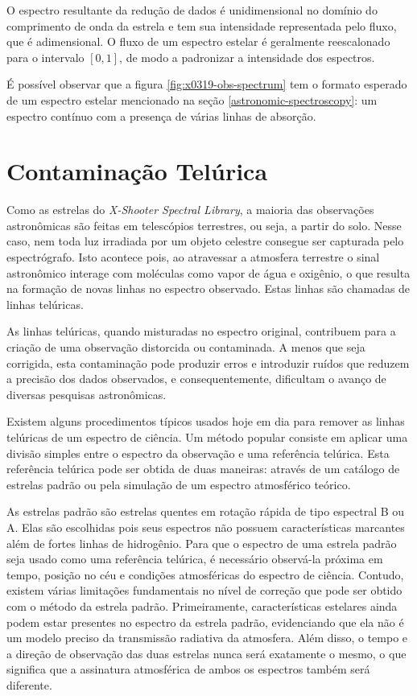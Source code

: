 O espectro resultante da redução de dados é unidimensional no domínio do comprimento de onda da estrela e tem sua intensidade representada pelo fluxo, que é adimensional. O fluxo de um espectro estelar é geralmente reescalonado para o intervalo $[0, 1]$, de modo a padronizar a intensidade dos espectros. 

É possível observar que a figura \ref{fig:x0319-obs-spectrum} tem o formato esperado de um espectro estelar mencionado na seção \ref{astronomic-spectroscopy}: um espectro contínuo com a presença de várias linhas de absorção.


\section{Contaminação Telúrica}

Como as estrelas do \textit{X-Shooter Spectral Library}, a maioria das observações astronômicas são feitas em telescópios terrestres, ou seja, a partir do solo. Nesse caso, nem toda luz irradiada por um objeto celestre consegue ser capturada pelo espectrógrafo. Isto acontece pois, ao atravessar a atmosfera terrestre o sinal astronômico interage com moléculas como vapor de água e oxigênio, o que resulta na formação de novas linhas no espectro observado. Estas linhas são chamadas de linhas telúricas.

As linhas telúricas, quando misturadas no espectro original, contribuem para a criação de uma observação distorcida ou contaminada. A menos que seja corrigida, esta contaminação pode produzir erros e introduzir ruídos que reduzem a precisão dos dados observados, e consequentemente, dificultam o avanço de diversas pesquisas astronômicas.

Existem alguns procedimentos típicos usados hoje em dia para remover as linhas telúricas de um espectro de ciência. Um método popular consiste em aplicar uma divisão simples entre o espectro da observação e uma referência telúrica. Esta referência telúrica pode ser obtida de duas maneiras: através de um catálogo de estrelas padrão ou pela simulação de um espectro atmosférico teórico.

As estrelas padrão são estrelas quentes em rotação rápida de tipo espectral B ou A. Elas são escolhidas pois seus espectros não possuem características marcantes além de fortes linhas de hidrogênio. Para que o espectro de uma estrela padrão seja usado como uma referência telúrica, é necessário observá-la próxima em tempo, posição no céu e condições atmosféricas do espectro de ciência. Contudo, existem várias limitações fundamentais no nível de correção que pode ser obtido com o método da estrela padrão. Primeiramente, características estelares ainda podem estar presentes no espectro da estrela padrão, evidenciando que ela não é um modelo preciso da transmissão radiativa da atmosfera. Além disso, o tempo e a direção de observação das duas estrelas nunca será exatamente o mesmo, o que significa que a assinatura atmosférica de ambos os espectros também será diferente.

